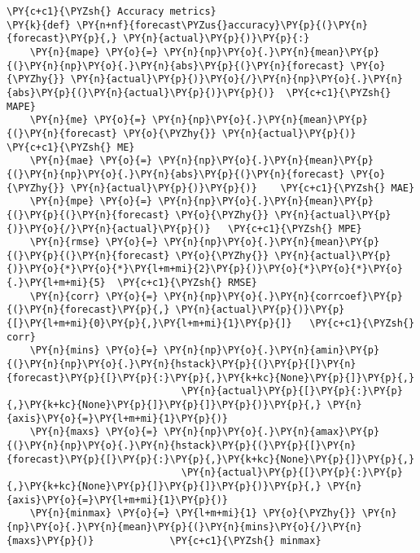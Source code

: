 \begin{tcolorbox}[breakable, size=fbox, boxrule=1pt, pad at break*=1mm,colback=cellbackground, colframe=cellborder]
\begin{Verbatim}[commandchars=\\\{\}]
\PY{c+c1}{\PYZsh{} Accuracy metrics}
\PY{k}{def} \PY{n+nf}{forecast\PYZus{}accuracy}\PY{p}{(}\PY{n}{forecast}\PY{p}{,} \PY{n}{actual}\PY{p}{)}\PY{p}{:}
    \PY{n}{mape} \PY{o}{=} \PY{n}{np}\PY{o}{.}\PY{n}{mean}\PY{p}{(}\PY{n}{np}\PY{o}{.}\PY{n}{abs}\PY{p}{(}\PY{n}{forecast} \PY{o}{\PYZhy{}} \PY{n}{actual}\PY{p}{)}\PY{o}{/}\PY{n}{np}\PY{o}{.}\PY{n}{abs}\PY{p}{(}\PY{n}{actual}\PY{p}{)}\PY{p}{)}  \PY{c+c1}{\PYZsh{} MAPE}
    \PY{n}{me} \PY{o}{=} \PY{n}{np}\PY{o}{.}\PY{n}{mean}\PY{p}{(}\PY{n}{forecast} \PY{o}{\PYZhy{}} \PY{n}{actual}\PY{p}{)}             \PY{c+c1}{\PYZsh{} ME}
    \PY{n}{mae} \PY{o}{=} \PY{n}{np}\PY{o}{.}\PY{n}{mean}\PY{p}{(}\PY{n}{np}\PY{o}{.}\PY{n}{abs}\PY{p}{(}\PY{n}{forecast} \PY{o}{\PYZhy{}} \PY{n}{actual}\PY{p}{)}\PY{p}{)}    \PY{c+c1}{\PYZsh{} MAE}
    \PY{n}{mpe} \PY{o}{=} \PY{n}{np}\PY{o}{.}\PY{n}{mean}\PY{p}{(}\PY{p}{(}\PY{n}{forecast} \PY{o}{\PYZhy{}} \PY{n}{actual}\PY{p}{)}\PY{o}{/}\PY{n}{actual}\PY{p}{)}   \PY{c+c1}{\PYZsh{} MPE}
    \PY{n}{rmse} \PY{o}{=} \PY{n}{np}\PY{o}{.}\PY{n}{mean}\PY{p}{(}\PY{p}{(}\PY{n}{forecast} \PY{o}{\PYZhy{}} \PY{n}{actual}\PY{p}{)}\PY{o}{*}\PY{o}{*}\PY{l+m+mi}{2}\PY{p}{)}\PY{o}{*}\PY{o}{*}\PY{o}{.}\PY{l+m+mi}{5}  \PY{c+c1}{\PYZsh{} RMSE}
    \PY{n}{corr} \PY{o}{=} \PY{n}{np}\PY{o}{.}\PY{n}{corrcoef}\PY{p}{(}\PY{n}{forecast}\PY{p}{,} \PY{n}{actual}\PY{p}{)}\PY{p}{[}\PY{l+m+mi}{0}\PY{p}{,}\PY{l+m+mi}{1}\PY{p}{]}   \PY{c+c1}{\PYZsh{} corr}
    \PY{n}{mins} \PY{o}{=} \PY{n}{np}\PY{o}{.}\PY{n}{amin}\PY{p}{(}\PY{n}{np}\PY{o}{.}\PY{n}{hstack}\PY{p}{(}\PY{p}{[}\PY{n}{forecast}\PY{p}{[}\PY{p}{:}\PY{p}{,}\PY{k+kc}{None}\PY{p}{]}\PY{p}{,} 
                              \PY{n}{actual}\PY{p}{[}\PY{p}{:}\PY{p}{,}\PY{k+kc}{None}\PY{p}{]}\PY{p}{]}\PY{p}{)}\PY{p}{,} \PY{n}{axis}\PY{o}{=}\PY{l+m+mi}{1}\PY{p}{)}
    \PY{n}{maxs} \PY{o}{=} \PY{n}{np}\PY{o}{.}\PY{n}{amax}\PY{p}{(}\PY{n}{np}\PY{o}{.}\PY{n}{hstack}\PY{p}{(}\PY{p}{[}\PY{n}{forecast}\PY{p}{[}\PY{p}{:}\PY{p}{,}\PY{k+kc}{None}\PY{p}{]}\PY{p}{,} 
                              \PY{n}{actual}\PY{p}{[}\PY{p}{:}\PY{p}{,}\PY{k+kc}{None}\PY{p}{]}\PY{p}{]}\PY{p}{)}\PY{p}{,} \PY{n}{axis}\PY{o}{=}\PY{l+m+mi}{1}\PY{p}{)}
    \PY{n}{minmax} \PY{o}{=} \PY{l+m+mi}{1} \PY{o}{\PYZhy{}} \PY{n}{np}\PY{o}{.}\PY{n}{mean}\PY{p}{(}\PY{n}{mins}\PY{o}{/}\PY{n}{maxs}\PY{p}{)}             \PY{c+c1}{\PYZsh{} minmax}

\end{Verbatim}
\end{tcolorbox}
